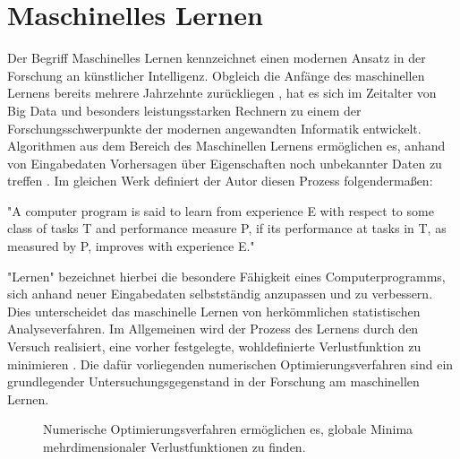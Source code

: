 \section{Maschinelles Lernen}
Der Begriff Maschinelles Lernen kennzeichnet einen modernen Ansatz in der Forschung an künstlicher Intelligenz. Obgleich die Anfänge des maschinellen Lernens bereits mehrere Jahrzehnte zurückliegen \citep{samuelStudiesMachineLearning1959, nilsson1965learning}, hat es sich im Zeitalter von Big Data und besonders leistungsstarken Rechnern zu einem der Forschungsschwerpunkte der modernen angewandten Informatik entwickelt. Algorithmen aus dem Bereich des Maschinellen Lernens ermöglichen es, anhand von Eingabedaten Vorhersagen über Eigenschaften noch unbekannter Daten zu treffen \citep{mitchellMachineLearning1997}. Im gleichen Werk definiert der Autor diesen Prozess folgendermaßen:

\begin{itquote}
    {\foreignlanguage{english}{"A computer program is said to learn from experience E with respect to some class of tasks T and performance measure P, if its performance at tasks in T, as measured by P, improves with experience E."}}
\end{itquote}

"Lernen" bezeichnet hierbei die besondere Fähigkeit eines Computerprogramms, sich anhand neuer Eingabedaten selbstständig anzupassen und zu verbessern. Dies unterscheidet das maschinelle Lernen von herkömmlichen statistischen Analyseverfahren. Im Allgemeinen wird der Prozess des Lernens durch den Versuch realisiert, eine vorher festgelegte, wohldefinierte Verlustfunktion zu minimieren . Die dafür vorliegenden numerischen Optimierungsverfahren sind ein grundlegender Untersuchungsgegenstand in der Forschung am maschinellen Lernen. 


\begin{figure}[htb]
    \captionsetup{justification=centering}

    \centering
    
    \centering
    \caption{Numerische Optimierungsverfahren ermöglichen es, globale Minima mehrdimensionaler Verlustfunktionen zu finden.}
    \label{fig:optimierung}
\end{figure}

